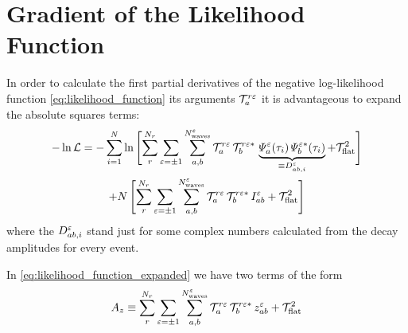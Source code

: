 \section{Gradient of the Likelihood Function}
\label{sec:likelihood_gradient}

In order to calculate the first partial derivatives of the negative
log-likelihood function \cref{eq:likelihood_function} \wrt its
arguments $\mathcal{T}_a^{r \varepsilon}$ it is advantageous to expand the
absolute squares terms:
\begin{multline}
  \label{eq:likelihood_function_expanded}
  -\ln \mathcal{L}
  = -\sum_{i = 1}^{N} \ln \sBrk[4]{\sum_r^{N_r} \sum_{\refl = \pm 1}
    \sum_{a, b}^{N^\refl_\text{waves}} \mathcal{T}_a^{r \refl}\, \mathcal{T}_b^{r \refl *}\,
    \underbrace{\Psi_a^\refl(\tau_i)\, \Psi_b^{\refl *}(\tau_i)}_{\equiv D^\refl_{a b, i}} + \mathcal{T}_\text{flat}^2} \\
  + N \sBrk[4]{\sum_r^{N_r} \sum_{\refl = \pm 1}
    \sum_{a, b}^{N^\refl_\text{waves}} \mathcal{T}_a^{r \refl}\, \mathcal{T}_b^{r \refl *}\, I^\refl_{a b} + \mathcal{T}_\text{flat}^2}
\end{multline}
where the $D^\varepsilon_{a b, i}$ stand just for some complex numbers
calculated from the decay amplitudes for every event.

In \cref{eq:likelihood_function_expanded} we have two terms of the
form
\begin{equation}
  \label{eq:likelihood_function_sum_term}
  A_z \equiv
  \sum_r^{N_r} \sum_{\varepsilon = \pm 1} \sum_{a, b}^{N^\varepsilon_\text{waves}} \mathcal{T}_a^{r \varepsilon}\, \mathcal{T}_b^{r \varepsilon *}\, z^\varepsilon_{a b} + \mathcal{T}_\text{flat}^2
\end{equation}

